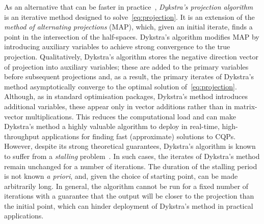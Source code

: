 \documentclass[onecolumn]{autart}
\begin{document}

As an alternative that can be faster in practice~\cite{KEMPF20206542}, \textit{Dykstra's projection algorithm}~\cite{DYKSTRA} is an iterative method designed to solve~\eqref{eq:projection}. It is an extension of the \textit{method of alternating projections} (MAP), which, given an initial iterate, finds a point in the intersection of the half-spaces. Dykstra's algorithm modifies MAP by introducing auxiliary variables to achieve strong convergence to the true projection. Qualitatively, Dykstra's algorithm stores the negative direction vector of projection into auxiliary variables; these are added to the primary variables before subsequent projections and, as a result, the primary iterates of Dykstra's method asymptotically converge to the optimal solution of~\eqref{eq:projection}. Although, as in standard optimisation packages, Dykstra's method introduces additional variables, these appear only in vector additions rather than in matrix-vector multiplications. This reduces the computational load and can make Dykstra's method a highly valuable algorithm to deploy in real-time, high-throughput applications for finding fast (approximate) solutions to CQPs. However, despite its strong theoretical guarantees, Dykstra's algorithm is known to suffer from a \emph{stalling} problem~\cite{DYKSTRASTALLING}. In such cases, the iterates of Dykstra's method remain unchanged for a number of iterations. The duration of the stalling period is not known \emph{a priori}, and, given the choice of starting point, can be made arbitrarily long. In general, the algorithm cannot be run for a fixed number of iterations with a guarantee that the output will be closer to the projection than the initial point, which can hinder deployment of Dykstra's method in practical applications.
\end{document}
